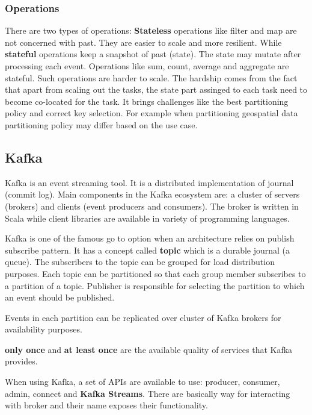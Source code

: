 \documentclass[a4]{report}
\begin{document}
    \subsubsection{Operations}
    There are two types of operations:
    \textbf{Stateless} operations like filter and map are not concerned with past.
    They are easier to scale and more resilient.
    While \textbf{stateful} operations keep a snapshot of past (state).
    The state may mutate after processing each event.
    Operations like sum, count, average and aggregate are stateful.
    Such operations are harder to scale.
    The hardship comes from the fact that apart from scaling out the tasks, the state part assinged to each task need
    to become co-located for the task.
    It brings challenges like the best partitioning policy and correct key selection.
    For example when partitioning geospatial data partitioning policy may differ based on the use case.

    \subsection{Kafka}
    Kafka\cite{kafka} is an event streaming tool.
    It is a distributed implementation of journal (commit log).
    Main components in the Kafka ecosystem are: a cluster of servers (brokers) and clients (event producers and consumers).
    The broker is written in Scala while client libraries are available in variety of programming languages.

    Kafka is one of the famous go to option when an architecture relies on publish subscribe pattern.
    It has a concept called \textbf{topic} which is a durable journal (a queue).
    The subscribers to the topic can be grouped for load distribution purposes.
    Each topic can be partitioned so that each group member subscribes to a partition of a topic.
    Publisher is responsible for selecting the partition to which an event should be published.

    Events in each partition can be replicated over cluster of Kafka brokers for availability purposes.

    \textbf{only once} and \textbf{at least once} are the available quality of services that Kafka provides.

    When using Kafka, a set of APIs are available to use: producer, consumer, admin, connect and \textbf{Kafka Streams}.
    There are basically way for interacting with broker and their name exposes their functionality.
\end{document}
